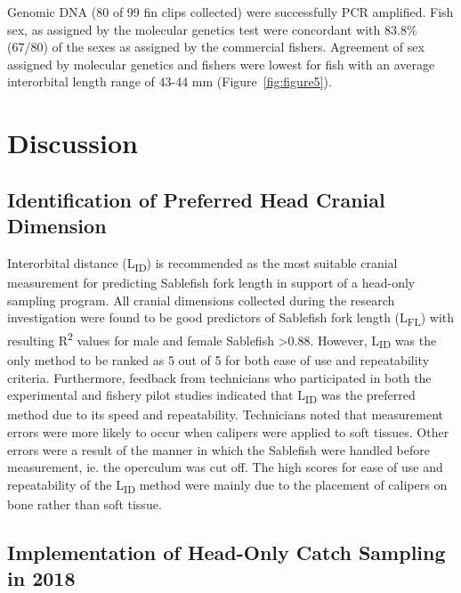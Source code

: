 \documentclass[12pt]{article}\usepackage[]{graphicx}\usepackage[]{color}
\begin{document}
Genomic DNA (80 of 99 fin clips collected) were successfully PCR amplified. Fish sex, as assigned by the molecular genetics test were concordant with 83.8\% (67/80) of the sexes as assigned by the commercial fishers. Agreement of sex assigned by molecular genetics and fishers were lowest for fish with an average interorbital length range of 43-44 mm (Figure~\ref{fig:figure5}).

\hypertarget{discussion}{%
\section{Discussion}\label{discussion}}

\hypertarget{identification-of-preferred-head-cranial-dimension}{%
\subsection{Identification of Preferred Head Cranial Dimension}\label{identification-of-preferred-head-cranial-dimension}}

Interorbital distance (L\textsubscript{ID}) is recommended as the most suitable cranial measurement for predicting Sablefish fork length in support of a head-only sampling program. All cranial dimensions collected during the research investigation were found to be good predictors of Sablefish fork length (L\textsubscript{FL}) with resulting R\textsuperscript{2} values for male and female Sablefish \textgreater0.88. However, L\textsubscript{ID} was the only method to be ranked as 5 out of 5 for both ease of use and repeatability criteria. Furthermore, feedback from technicians who participated in both the experimental and fishery pilot studies indicated that L\textsubscript{ID} was the preferred method due to its speed and repeatability. Technicians noted that measurement errors were more likely to occur when calipers were applied to soft tissues. Other errors were a result of the manner in which the Sablefish were handled before measurement, ie. the operculum was cut off. The high scores for ease of use and repeatability of the L\textsubscript{ID} method were mainly due to the placement of calipers on bone rather than soft tissue.

\hypertarget{implementation-of-head-only-catch-sampling-in-2018}{%
\subsection{Implementation of Head-Only Catch Sampling in 2018}\label{implementation-of-head-only-catch-sampling-in-2018}}
\end{document}
